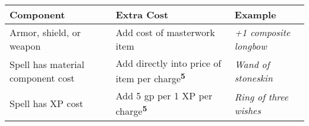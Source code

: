 \begin{longtable}{llllll}
\hline
\multicolumn{4}{p{1.366in}|}{\begin{minipage}[t]{1.366in}\raggedright
\textbf{Component }\end{minipage}} & \multicolumn{1}{|p{1.506in}|}{\begin{minipage}[t]{1.506in}\raggedright
\textbf{Extra Cost }\end{minipage}} & \multicolumn{1}{p{1.628in}|}{\begin{minipage}[t]{1.628in}\raggedright
\textbf{Example}\end{minipage}}\\
\hline
\multicolumn{4}{p{1.366in}|}{\begin{minipage}[t]{1.366in}\raggedright
Armor, shield, or weapon \end{minipage}} & \multicolumn{1}{|p{1.506in}|}{\begin{minipage}[t]{1.506in}\raggedright
Add cost of masterwork item \end{minipage}} & \multicolumn{1}{p{1.628in}|}{\begin{minipage}[t]{1.628in}\raggedright
\textit{+1 composite longbow}\end{minipage}}\\
\hline
\multicolumn{4}{p{1.366in}|}{\begin{minipage}[t]{1.366in}\raggedright
Spell has material component cost \end{minipage}} & \multicolumn{1}{|p{1.506in}|}{\begin{minipage}[t]{1.506in}\raggedright
Add directly into price of item per charge\textsuperscript{\textbf{5}}\textbf{ 
}\end{minipage}} & \multicolumn{1}{p{1.628in}|}{\begin{minipage}[t]{1.628in}\raggedright
\textit{Wand of stoneskin}\end{minipage}}\\
\hline
\multicolumn{4}{p{1.366in}|}{\begin{minipage}[t]{1.366in}\raggedright
Spell has XP cost \end{minipage}} & \multicolumn{1}{|p{1.506in}|}{\begin{minipage}[t]{1.506in}\raggedright
Add 5 gp per 1 XP per charge\textsuperscript{\textbf{5}}\textbf{ }\end{minipage}} & \multicolumn{1}{p{1.628in}|}{\begin{minipage}[t]{1.628in}\raggedright
\textit{Ring of three wishes}\end{minipage}}\\

\end{longtable}

